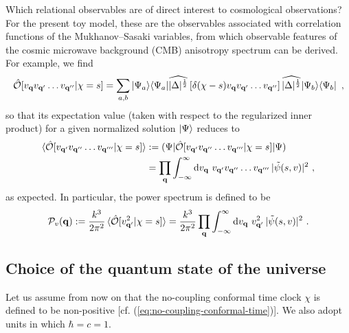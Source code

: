 \documentclass[12pt]{iopart}
\def\eq#1{\begin{equation}\begin{aligned}#1\end{aligned}\end{equation}}
\def\eref#1{(\ref{eq:#1})}
\def\D{\mathrm{d}}
\def\Ob{\mathcal{O}}
\def\q{\mathbf{q}}
\begin{document}
Which relational observables are of direct interest to cosmological observations? For the present toy model, these are the observables associated with correlation functions of the Mukhanov--Sasaki variables, from which observable features of the cosmic microwave background (CMB) anisotropy spectrum can be derived. For example, we find
\eq{
\hat{\Ob}[v_{\q}v_{\q'}\ldots v_{\q''}|\chi=s] = \sum_{a,b}\ket{\Psi_a}\!\braket{\Psi_a|\widehat{|\Delta|^{\frac12}}\left[\delta(\chi-s)v_{\q}v_{\q'}\ldots v_{\q''}\right]\widehat{|\Delta|^{\frac12}}|\Psi_b}\!\bra{\Psi_b} \ ,
}
so that its expectation value (taken with respect to the regularized inner product) for a given normalized solution $\ket{\Psi}$ reduces to
\eq{
\braket{\hat{\Ob}[v_{\q'}v_{\q''}\ldots v_{\q'''}|\chi=s]} &:= (\Psi|\hat{\Ob}[v_{\q'}v_{\q''}\ldots v_{\q'''}|\chi=s]|\Psi)\\
&= \prod_{\q}\int_{-\infty}^{\infty}\D v_{\q}\ v_{\q'}v_{\q''}\ldots v_{\q'''}\, |\tilde{\psi}(s,v)|^2 \ ,
}
as expected. In particular, the power spectrum is defined to be \citep{Chataignier:2020fap}
\eq{\label{eq:power-spectrum}
\mathcal{P}_v(\q) := \frac{k^3}{2\pi^2}\braket{\hat{\Ob}[v_{\q'}^2|\chi=s]} = \frac{k^3}{2\pi^2}\prod_{\q}\int_{-\infty}^{\infty}\D v_{\q}\ v_{\q'}^2\, |\tilde{\psi}(s,v)|^2 \ .
}

\subsection{\label{sec:choice-state}Choice of the quantum state of the universe}
Let us assume from now on that the no-coupling conformal time clock $\chi$ is defined to be non-positive [cf. \eref{no-coupling-conformal-time}]. We also adopt units in which $\hbar = c = 1$.
\end{document}
